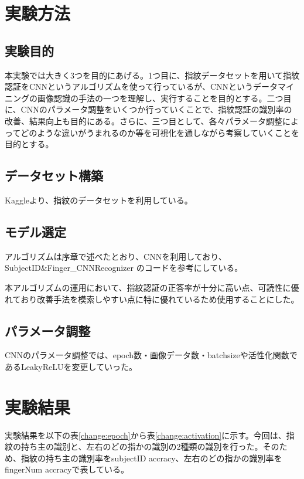 \documentclass[a4paper, 11pt, titlepage]{jsarticle}
\begin{document}
\section{実験方法}


\subsection{実験目的}
本実験では大きく3つを目的にあげる。1つ目に、指紋データセットを用いて指紋認証をCNNというアルゴリズムを使って行っているが、CNNというデータマイニングの画像認識の手法の一つを理解し、実行することを目的とする。二つ目に、CNNのパラメータ調整をいくつか行っていくことで、指紋認証の識別率の改善、結果向上も目的にある。さらに、三つ目として、各々パラメータ調整によってどのような違いがうまれるのか等を可視化を通しながら考察していくことを目的とする。


\subsection{データセット構築}
Kaggleより、指紋のデータセット\cite{cnn}を利用している。

\subsection{モデル選定}
アルゴリズムは序章で述べたとおり、CNNを利用しており、SubjectID\&Finger\_CNNRecognizer
\cite{algorithm}のコードを参考にしている。

本アルゴリズムの運用において、指紋認証の正答率が十分に高い点、可読性に優れており改善手法を模索しやすい点に特に優れているため使用することにした。

\subsection{パラメータ調整}
CNNのパラメータ調整では、epoch数・画像データ数・batchsizeや活性化関数であるLeakyReLUを変更していった。


\section{実験結果}

実験結果を以下の表\ref{change:epoch}から表\ref{change:activation}に示す。今回は、指紋の持ち主の識別と、左右のどの指かの識別の2種類の識別を行った。そのため、指紋の持ち主の識別率をsubjectID accracy、左右のどの指かの識別率をfingerNum accracyで表している。
\end{document}
